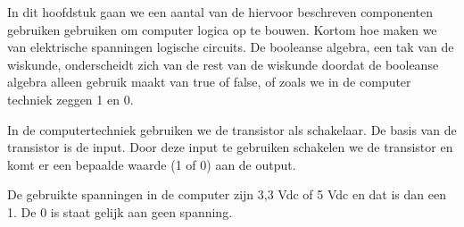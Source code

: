 In dit hoofdstuk gaan we een aantal van de hiervoor beschreven componenten gebruiken gebruiken om computer logica op te bouwen. Kortom hoe maken we van elektrische spanningen logische circuits. De booleanse algebra, een tak van de wiskunde, onderscheidt zich van de rest van de wiskunde doordat de booleanse algebra alleen gebruik maakt van true of false, of zoals we in de computer techniek zeggen 1 en 0.

In de computertechniek gebruiken we de transistor als schakelaar. De basis van de transistor is de input. Door deze input te gebruiken schakelen we de transistor en komt er een bepaalde waarde (1 of 0) aan de output.

De gebruikte spanningen in de computer zijn 3,3 Vdc of 5 Vdc en dat is dan een 1. De 0 is staat gelijk aan geen spanning.

